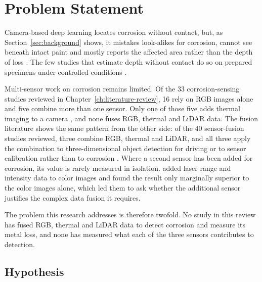 \section{Problem Statement}
\label{sec:problem-statement}

Camera-based deep learning locates corrosion without contact, but, as
Section~\ref{sec:background} shows, it mistakes look-alikes for corrosion,
cannot see beneath intact paint and mostly reports the affected area rather
than the depth of loss \citep{Alvani2026,Savino2025}. The few studies that
estimate depth without contact do so on prepared specimens under controlled
conditions \citep{Egodawela2025,Doshvarpassand2022,Haitz2022,Maru2025}.

Multi-sensor work on corrosion remains limited. Of the 33 corrosion-sensing
studies reviewed in Chapter~\ref{ch:literature-review}, 16 rely on RGB images
alone and five combine more than one sensor. Only one of those five adds
thermal imaging to a camera \citep{Lim2021}, and none fuses RGB, thermal and
LiDAR data. The fusion literature shows the same pattern from the other side:
of the 40 sensor-fusion studies reviewed, three combine RGB, thermal and LiDAR,
and all three apply the combination to three-dimensional object detection for
driving or to sensor calibration rather than to corrosion
\citep{Tran2025,Tran2024,Yang2024}. Where a second sensor has been added for
corrosion, its value is rarely measured in isolation. \citet{Haitz2022} added
laser range and intensity data to color images and found the result only
marginally superior to the color images alone, which led them to ask whether
the additional sensor justifies the complex data fusion it requires.

The problem this research addresses is therefore twofold. No study in this
review has fused RGB, thermal and LiDAR data to detect corrosion and measure
its metal loss, and none has measured what each of the three sensors
contributes to detection.

\subsection*{Hypothesis}

